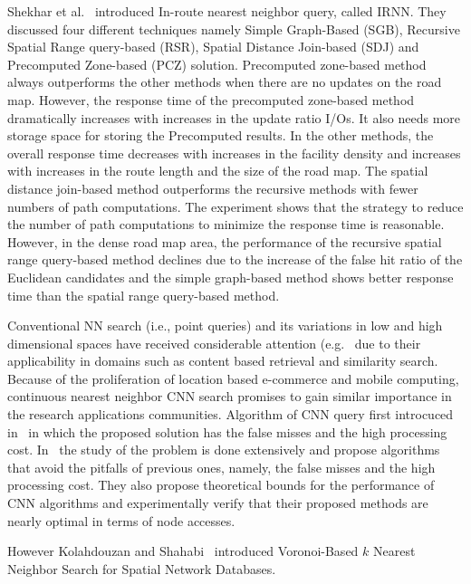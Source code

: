 Shekhar et al.~\cite{NN7} introduced In-route nearest neighbor query, called IRNN. They discussed four different techniques namely Simple Graph-Based (SGB), Recursive Spatial Range query-based (RSR), Spatial Distance Join-based (SDJ) and Precomputed Zone-based
(PCZ) solution. Precomputed zone-based method always outperforms the other methods when there are no updates on the road map. However, the response time of the precomputed zone-based method dramatically increases with increases in the update ratio I/Os. It also needs more storage space for storing the Precomputed results. In the other methods, the overall response time decreases with increases in the facility density and increases with increases in the route length and the size of the road map. The spatial distance join-based method outperforms the recursive methods with fewer numbers of path computations. The experiment shows that the strategy to reduce the number of path computations to minimize the response time is reasonable. However, in the dense road map area, the performance of the recursive spatial range query-based method declines due to the increase of the false hit ratio of the Euclidean candidates and the simple graph-based method shows better response time than the spatial range query-based method.

Conventional NN search (i.e., point queries) and its variations in low and high dimensional spaces have received considerable attention (e.g.~\cite{NN9, NN4} due to their applicability in domains such as content based retrieval and similarity search. Because of the proliferation of location based e-commerce and mobile computing, continuous nearest neighbor CNN search promises to gain similar importance in the research applications communities. Algorithm of CNN query first introcuced in~\cite{NN10} in which  the proposed solution has the false misses and the high processing cost. In~\cite{NN4} the study of the problem is done
extensively and propose algorithms that avoid the pitfalls of previous ones, namely, the false misses and the high processing cost. They also propose theoretical bounds for the performance of CNN algorithms and experimentally verify that their proposed methods are nearly optimal in terms of node accesses.

However Kolahdouzan and Shahabi~\cite{NN11} introduced Voronoi-Based  $k$ Nearest Neighbor Search for Spatial
Network Databases.

